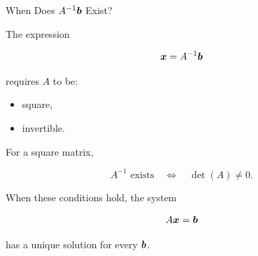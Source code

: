 
\begin{frame}{When Does $A^{-1}\bm{b}$ Exist?}

The expression

\[
\bm{x}=A^{-1}\bm{b}
\]

requires $A$ to be:

\begin{itemize}
    \item square,
    \item invertible.
\end{itemize}

For a square matrix,

\[
A^{-1}\text{ exists}
\quad\Longleftrightarrow\quad
\det(A)\neq0.
\]


When these conditions hold, the system

\[
A\bm{x}=\bm{b}
\]

has a unique solution for every $\bm{b}$.

\end{frame}



